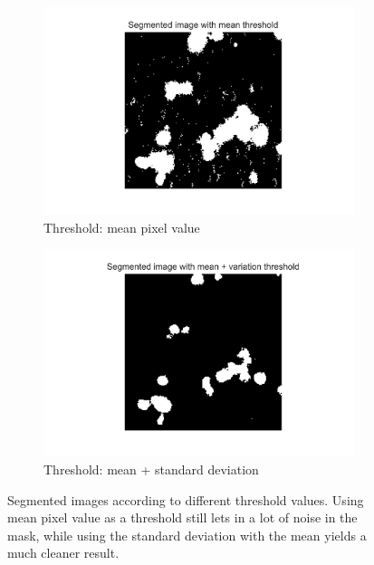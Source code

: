 \begin{figure}[h]
    \centering
    \begin{subfigure}[h!]{0.4\textwidth}
        \includegraphics[width=\textwidth]{dissertation/figures/mean_threshold_cell.jpg}
        \caption{Threshold: mean pixel value}
        \label{fig:thresholdmean}
    \end{subfigure}
    \begin{subfigure}[h!]{0.4\textwidth}
        \includegraphics[width=\textwidth]{dissertation/figures/mean_std_threshold_cell.jpg}
        \caption{Threshold: mean + standard deviation}
        \label{fig:thresholdstd}
    \end{subfigure}
    \caption{Segmented images according to different threshold values. Using mean pixel value as a threshold still lets in a lot of noise in the mask, while using the standard deviation with the mean yields a much cleaner result.}
\end{figure}

